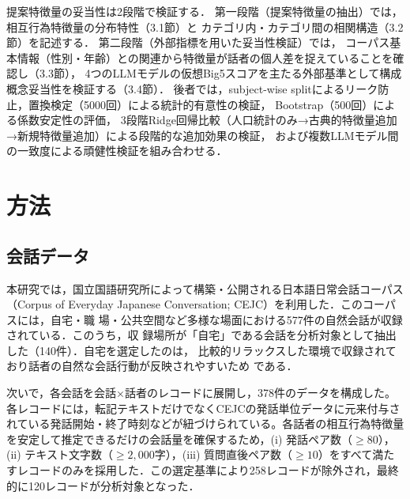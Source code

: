 \documentclass[dvipdfmx,11pt,a4paper]{bxjsarticle}
\renewcommand{\_}{\paperorigunderscore\allowbreak}%
\begin{document}
提案特徴量の妥当性は2段階で検証する．
第一段階（提案特徴量の抽出）では，相互行為特徴量の分布特性（3.1節）と
カテゴリ内・カテゴリ間の相関構造（3.2節）を記述する．
第二段階（外部指標を用いた妥当性検証）では，
コーパス基本情報（性別・年齢）との関連から特徴量が話者の個人差を捉えていることを確認し（3.3節），
4つのLLMモデルの仮想Big5スコアを主たる外部基準として構成概念妥当性を検証する（3.4節）．
後者では，subject-wise splitによるリーク防止，置換検定（5000回）による統計的有意性の検証，
Bootstrap（500回）による係数安定性の評価，
3段階Ridge回帰比較（人口統計のみ→古典的特徴量追加→新規特徴量追加）による段階的な追加効果の検証，
および複数LLMモデル間の一致度による頑健性検証を組み合わせる．

\section{方法}

\subsection{会話データ}
\label{sec:data}

本研究では，国立国語研究所によって構築・公開される日本語日常会話コーパス（Corpus
of Everyday Japanese Conversation; CEJC）を利用した．このコーパスには，自宅・職
場・公共空間など多様な場面における577件の自然会話が収録されている．このうち，収
録場所が「自宅」である会話を分析対象として抽出した（140件）．自宅を選定したのは，
比較的リラックスした環境で収録されており話者の自然な会話行動が反映されやすいため
である．


次いで，各会話を会話$\times$話者のレコードに展開し，378件のデータを構成した。各レコードには，転記テキストだけでなくCEJCの発話単位データに元来付与されている発話開始・終了時刻などが紐づけられている。各話者の相互行為特徴量を安定して推定できるだけの会話量を確保するため，(i) 発話ペア数（$\geq 80$），(ii) テキスト文字数（$\geq 2{,}000$字），(iii) 質問直後ペア数（$\geq 10$）をすべて満たすレコードのみを採用した．この選定基準により258レコードが除外され，最終的に120レコードが分析対象となった．

\end{document}
